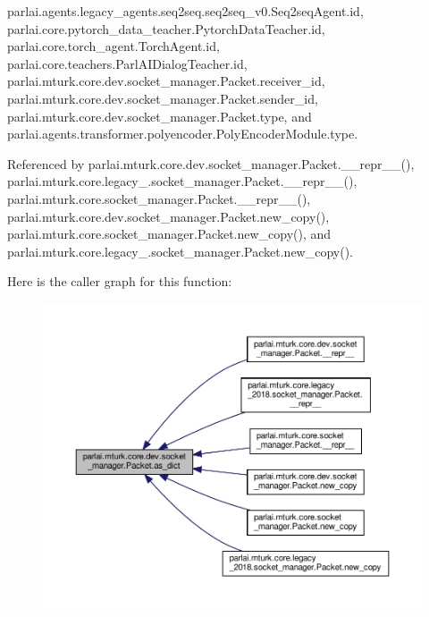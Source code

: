 parlai.\+agents.\+legacy\+\_\+agents.\+seq2seq.\+seq2seq\+\_\+v0.\+Seq2seq\+Agent.\+id, parlai.\+core.\+pytorch\+\_\+data\+\_\+teacher.\+Pytorch\+Data\+Teacher.\+id, parlai.\+core.\+torch\+\_\+agent.\+Torch\+Agent.\+id, parlai.\+core.\+teachers.\+Parl\+A\+I\+Dialog\+Teacher.\+id, parlai.\+mturk.\+core.\+dev.\+socket\+\_\+manager.\+Packet.\+receiver\+\_\+id, parlai.\+mturk.\+core.\+dev.\+socket\+\_\+manager.\+Packet.\+sender\+\_\+id, parlai.\+mturk.\+core.\+dev.\+socket\+\_\+manager.\+Packet.\+type, and parlai.\+agents.\+transformer.\+polyencoder.\+Poly\+Encoder\+Module.\+type.



Referenced by parlai.\+mturk.\+core.\+dev.\+socket\+\_\+manager.\+Packet.\+\_\+\+\_\+repr\+\_\+\+\_\+(), parlai.\+mturk.\+core.\+legacy\+\_.\+socket\+\_\+manager.\+Packet.\+\_\+\+\_\+repr\+\_\+\+\_\+(), parlai.\+mturk.\+core.\+socket\+\_\+manager.\+Packet.\+\_\+\+\_\+repr\+\_\+\+\_\+(), parlai.\+mturk.\+core.\+dev.\+socket\+\_\+manager.\+Packet.\+new\+\_\+copy(), parlai.\+mturk.\+core.\+socket\+\_\+manager.\+Packet.\+new\+\_\+copy(), and parlai.\+mturk.\+core.\+legacy\+\_.\+socket\+\_\+manager.\+Packet.\+new\+\_\+copy().

Here is the caller graph for this function\+:
\nopagebreak
\begin{figure}[H]
\begin{center}
\leavevmode
\includegraphics[width=350pt]{classparlai_1_1mturk_1_1core_1_1dev_1_1socket__manager_1_1Packet_a806382fb1c252d86229e9f846cfec6c9_icgraph}
\end{center}
\end{figure}
\mbox{\label{classparlai_1_1mturk_1_1core_1_1dev_1_1socket__manager_1_1Packet_a02cdee81b0dbf9f893da7f288eadf1ea}} 
